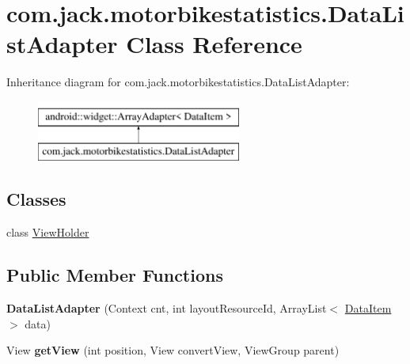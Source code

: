 \hypertarget{classcom_1_1jack_1_1motorbikestatistics_1_1_data_list_adapter}{}\section{com.\+jack.\+motorbikestatistics.\+Data\+List\+Adapter Class Reference}
\label{classcom_1_1jack_1_1motorbikestatistics_1_1_data_list_adapter}
Inheritance diagram for com.\+jack.\+motorbikestatistics.\+Data\+List\+Adapter\+:\begin{figure}[H]
\begin{center}
\leavevmode
\includegraphics[height=2.000000cm]{classcom_1_1jack_1_1motorbikestatistics_1_1_data_list_adapter}
\end{center}
\end{figure}
\subsection*{Classes}
\begin{DoxyCompactItemize}
\item 
class \hyperlink{classcom_1_1jack_1_1motorbikestatistics_1_1_data_list_adapter_1_1_view_holder}{View\+Holder}
\end{DoxyCompactItemize}
\subsection*{Public Member Functions}
\begin{DoxyCompactItemize}
\item 
\mbox{\label{classcom_1_1jack_1_1motorbikestatistics_1_1_data_list_adapter_aa9aad25299a2df8a357569b6eb3c28b5}} 
{\bfseries Data\+List\+Adapter} (Context cnt, int layout\+Resource\+Id, Array\+List$<$ \hyperlink{classcom_1_1jack_1_1motorbikestatistics_1_1_data_item}{Data\+Item} $>$ data)
\item 
\mbox{\label{classcom_1_1jack_1_1motorbikestatistics_1_1_data_list_adapter_a724cb5f4a43bba97dbfdbc08aa9e3015}} 
View {\bfseries get\+View} (int position, View convert\+View, View\+Group parent)
\end{DoxyCompactItemize}

